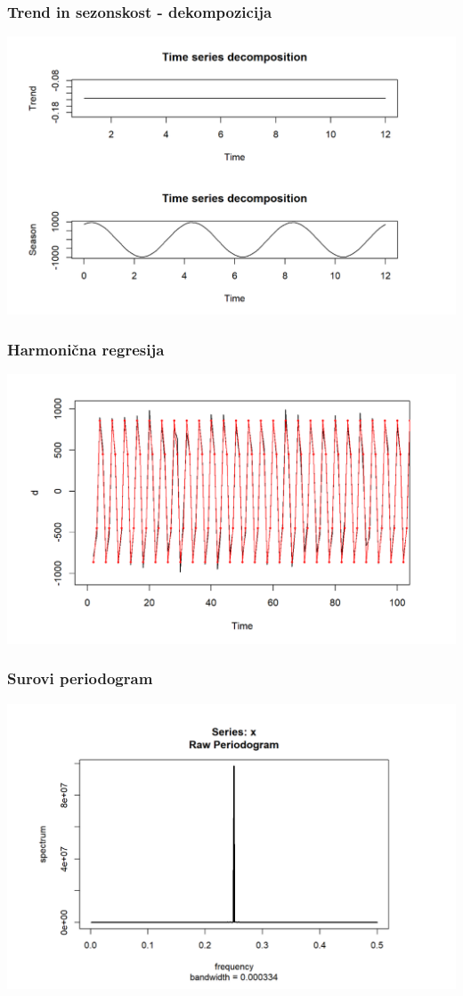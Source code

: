 \documentclass[10pt]{beamer}
\begin{document}
\begin{frame}
\frametitle{Trend in sezonskost - dekompozicija}
\includegraphics[width=1\textwidth]{decompositionA.png}
\end{frame}


\begin{frame}
\frametitle{Harmonična regresija}
\includegraphics[width=1\textwidth]{fit_A.png}
\end{frame}

\begin{frame}
\frametitle{Surovi periodogram}
\includegraphics[width=1\textwidth]{per_raw1A.png}
\end{frame}
\end{document}
